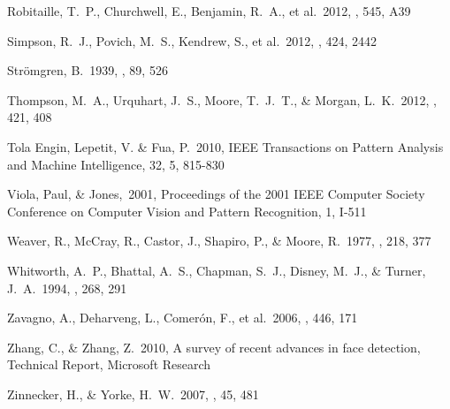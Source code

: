\begin{thebibliography}{16}
 Robitaille, T.~P., Churchwell, E., Benjamin, R.~A., et al.\ 2012, \aap, 545, A39

 Simpson, R.~J., Povich,
M.~S., Kendrew, S., et al.\ 2012, \mnras, 424, 2442

 Str{\"o}mgren, B.\ 1939,
\apj, 89, 526

 Thompson, M.~A.,
Urquhart, J.~S., Moore, T.~J.~T., \& Morgan, L.~K.\ 2012, \mnras, 421, 408

Tola Engin, Lepetit, V. \& Fua, P.\ 2010, IEEE Transactions on Pattern Analysis and Machine Intelligence, 32, 5, 815-830

Viola, Paul, \& Jones,\ 2001, Proceedings of the 2001 IEEE Computer Society Conference on Computer Vision and Pattern Recognition, 1, I-511

 Weaver, R., McCray, R.,
Castor, J., Shapiro, P., \& Moore, R.\ 1977, \apj, 218, 377

 Whitworth, A.~P.,
Bhattal, A.~S., Chapman, S.~J., Disney, M.~J.,
\& Turner, J.~A.\ 1994, \mnras, 268, 291

 Zavagno, A., Deharveng, L., Comer{\'o}n, F., et al.\ 2006, \aap, 446, 171

Zhang, C., \& Zhang, Z.\ 2010, A survey of recent advances in face detection, Technical Report, Microsoft Research

 Zinnecker, H., \& Yorke, H.~W.\ 2007, \araa, 45, 481

\end{thebibliography}

